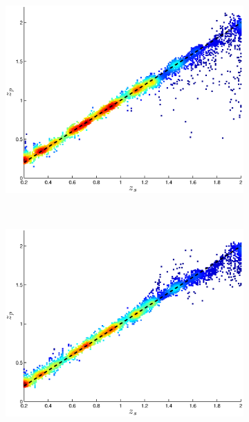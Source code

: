 \documentclass[useAMS,usenatbib,fleqn]{mn2e}
\begin{document}
\begin{figure}
        \centering
        \begin{subfigure}[b]{0.3\textwidth}
                \includegraphics[width=\textwidth]{figures/23_0.eps}
        \end{subfigure}
        ~
        \begin{subfigure}[b]{0.3\textwidth}
                \includegraphics[width=\textwidth]{figures/23_L.eps}
        \end{subfigure}
        ~
        \begin{subfigure}[b]{0.3\textwidth}

\end{subfigure}
\end{figure}
\end{document}
